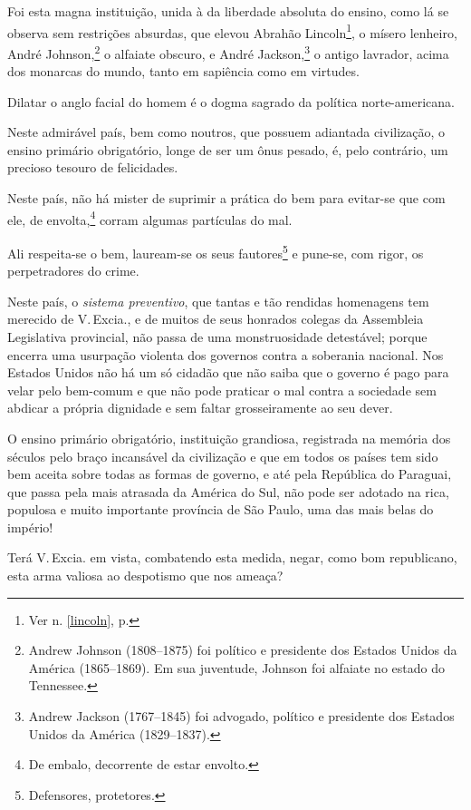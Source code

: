 Foi esta magna instituição, unida à da liberdade absoluta do ensino,
como lá se observa sem restrições absurdas, que elevou Abrahão
Lincoln\footnote{Ver n. \ref{lincoln}, p. \pageref{lincoln}}, o mísero 
lenheiro, André Johnson,\footnote{Andrew Johnson (1808--1875) foi político 
e presidente dos Estados Unidos da América (1865--1869). Em sua juventude, 
Johnson foi alfaiate no estado do Tennessee.} o alfaiate obscuro, e André
Jackson,\footnote{Andrew Jackson (1767--1845) foi advogado, político e
  presidente dos Estados Unidos da América (1829--1837).} o antigo
lavrador, acima dos monarcas do mundo, tanto em sapiência como em
virtudes.

Dilatar o anglo facial do homem é o dogma sagrado da política
norte-americana.

Neste admirável país, bem como noutros, que possuem adiantada
civilização, o ensino primário obrigatório, longe de ser um ônus pesado,
é, pelo contrário, um precioso tesouro de felicidades.

Neste país, não há mister de suprimir a prática do bem para evitar-se
que com ele, de envolta,\footnote{De embalo, decorrente de estar
  envolto.} corram algumas partículas do mal.

Ali respeita-se o bem, lauream-se os seus fautores\footnote{
  Defensores, protetores.} e pune-se, com rigor, os perpetradores do
crime.

Neste país, o \emph{sistema preventivo}, que tantas e tão rendidas
homenagens tem merecido de V.\,Excia., e de muitos de seus honrados
colegas da Assembleia Legislativa provincial, não passa de uma
monstruosidade detestável; porque encerra uma usurpação violenta dos
governos contra a soberania nacional. Nos Estados Unidos não há um só
cidadão que não saiba que o governo é pago para velar pelo bem-comum e
que não pode praticar o mal contra a sociedade sem abdicar a própria
dignidade e sem faltar grosseiramente ao seu dever.

O ensino primário obrigatório, instituição grandiosa, registrada na
memória dos séculos pelo braço incansável da civilização e que em todos
os países tem sido bem aceita sobre todas as formas de governo, e até
pela República do Paraguai, que passa pela mais atrasada da América do
Sul, não pode ser adotado na rica, populosa e muito importante província
de São Paulo, uma das mais belas do império!

Terá V.\,Excia. em vista, combatendo esta medida, negar, como bom
republicano, esta arma valiosa ao despotismo que nos ameaça?

